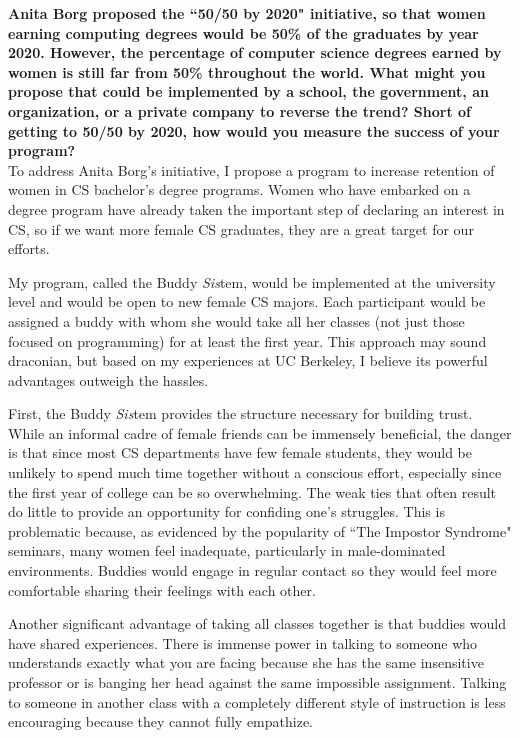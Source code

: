 \documentclass{article}
\begin{document}
	
\pagestyle{plain}

\textbf{Anita Borg proposed the ``50/50 by 2020" initiative, so that women earning computing degrees would be 50\% of the graduates by year 2020. However, the percentage of computer science degrees earned by women is still far from 50\% throughout the world.  What might you propose that could be implemented by a school, the government, an organization, or a private company to reverse the trend? Short of getting to 50/50 by 2020, how would you measure the success of your program?}\\

To address Anita Borg's initiative, I propose a program to increase retention of women in CS bachelor's degree programs.
Women who have embarked on a degree program have already taken the important step of declaring an interest in CS, so if we want more female CS graduates, they are a great target for our efforts.

My program, called the Buddy \textit{Sis}tem, would be implemented at the university level and would be open to new female CS majors.
Each participant would be assigned a buddy with whom she would take all her classes (not just those focused on programming) for at least the first year.
This approach may sound draconian, but based on my experiences at UC Berkeley, I believe its powerful advantages outweigh the hassles.

First, the Buddy \textit{Sis}tem provides the structure necessary for building trust.
While an informal cadre of female friends can be immensely beneficial, the danger is that since most CS departments have few female students, they would be unlikely to spend much time together without a conscious effort, especially since the first year of college can be so overwhelming.
The weak ties that often result do little to provide an opportunity for confiding one's struggles.
This is problematic because, as evidenced by the popularity of ``The Impostor Syndrome" seminars, many women feel inadequate, particularly in male-dominated environments.
Buddies would engage in regular contact so they would feel more comfortable sharing their feelings with each other.

Another significant advantage of taking all classes together is that buddies would have shared experiences.
There is immense power in talking to someone who understands exactly what you are facing because she has the same insensitive professor or is banging her head against the same impossible assignment.
Talking to someone in another class with a completely different style of instruction is less encouraging because they cannot fully empathize.
\end{document}
